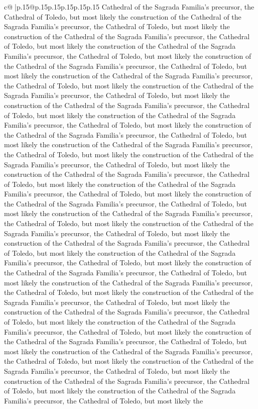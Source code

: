 \documentclass{article}
\begin{document}
{\begin{supertabular}{c@{$\;$}|p{.15\linewidth}@{}p{.15\linewidth}p{.15\linewidth}p{.15\linewidth}p{.15\linewidth}p{.15\linewidth}}
{{{Cathedral of the Sagrada Familia's precursor, the Cathedral of Toledo, but most likely the construction of the Cathedral of the Sagrada Familia's precursor, the Cathedral of Toledo, but most likely the construction of the Cathedral of the Sagrada Familia's precursor, the Cathedral of Toledo, but most likely the construction of the Cathedral of the Sagrada Familia's precursor, the Cathedral of Toledo, but most likely the construction of the Cathedral of the Sagrada Familia's precursor, the Cathedral of Toledo, but most likely the construction of the Cathedral of the Sagrada Familia's precursor, the Cathedral of Toledo, but most likely the construction of the Cathedral of the Sagrada Familia's precursor, the Cathedral of Toledo, but most likely the construction of the Cathedral of the Sagrada Familia's precursor, the Cathedral of Toledo, but most likely the construction of the Cathedral of the Sagrada Familia's precursor, the Cathedral of Toledo, but most likely the construction of the Cathedral of the Sagrada Familia's precursor, the Cathedral of Toledo, but most likely the construction of the Cathedral of the Sagrada Familia's precursor, the Cathedral of Toledo, but most likely the construction of the Cathedral of the Sagrada Familia's precursor, the Cathedral of Toledo, but most likely the construction of the Cathedral of the Sagrada Familia's precursor, the Cathedral of Toledo, but most likely the construction of the Cathedral of the Sagrada Familia's precursor, the Cathedral of Toledo, but most likely the construction of the Cathedral of the Sagrada Familia's precursor, the Cathedral of Toledo, but most likely the construction of the Cathedral of the Sagrada Familia's precursor, the Cathedral of Toledo, but most likely the construction of the Cathedral of the Sagrada Familia's precursor, the Cathedral of Toledo, but most likely the construction of the Cathedral of the Sagrada Familia's precursor, the Cathedral of Toledo, but most likely the construction of the Cathedral of the Sagrada Familia's precursor, the Cathedral of Toledo, but most likely the construction of the Cathedral of the Sagrada Familia's precursor, the Cathedral of Toledo, but most likely the construction of the Cathedral of the Sagrada Familia's precursor, the Cathedral of Toledo, but most likely the construction of the Cathedral of the Sagrada Familia's precursor, the Cathedral of Toledo, but most likely the construction of the Cathedral of the Sagrada Familia's precursor, the Cathedral of Toledo, but most likely the construction of the Cathedral of the Sagrada Familia's precursor, the Cathedral of Toledo, but most likely the construction of the Cathedral of the Sagrada Familia's precursor, the Cathedral of Toledo, but most likely the construction of the Cathedral of the Sagrada Familia's precursor, the Cathedral of Toledo, but most likely the construction of the Cathedral of the Sagrada Familia's precursor, the Cathedral of Toledo, but most likely the construction of the Cathedral of the Sagrada Familia's precursor, the Cathedral of Toledo, but most likely the construction of the Cathedral of the Sagrada Familia's precursor, the Cathedral of Toledo, but most likely the }}}
\end{supertabular}}
\end{document}
